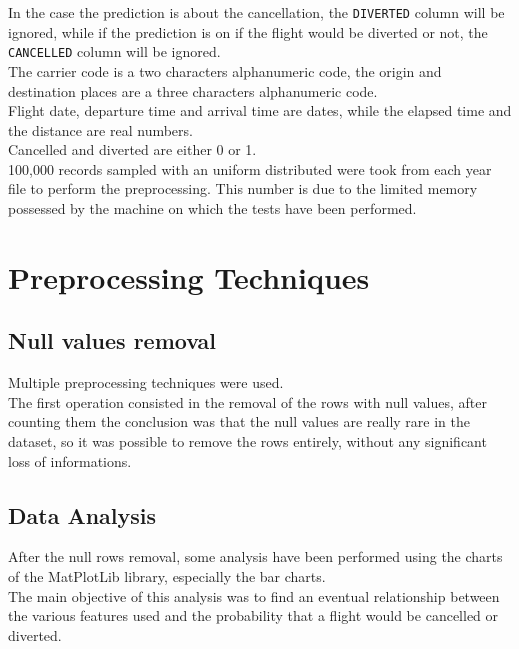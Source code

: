 \documentclass[
	letterpaper, %
	10pt, %
]{class}
\begin{document}
In the case the prediction is about the cancellation, the \texttt{DIVERTED} column will be ignored, while if the prediction is on if the flight would be diverted or not, the \texttt{CANCELLED} column will be ignored.\\

The carrier code is a two characters alphanumeric code, the origin and destination places are a three characters alphanumeric code.\\
Flight date, departure time and arrival time are dates, while the elapsed time and the distance are real numbers.\\
Cancelled and diverted are either 0 or 1.\\

100,000 records sampled with an uniform distributed were took from each year file to perform the preprocessing. This number is due to the limited memory
possessed by the machine on which the tests have been performed.


\section{Preprocessing Techniques}

\subsection{Null values removal}

Multiple preprocessing techniques were used.\\

The first operation consisted in the removal of the rows with null values, after counting them the conclusion was that the null values are really rare in the dataset, so it was possible to remove the rows entirely, without any significant loss of informations.\\

\subsection{Data Analysis}
After the null rows removal, some analysis have been performed using the charts of the MatPlotLib library, especially the bar charts.\\
The main objective of this analysis was to find an eventual relationship between the various features used and the probability that a flight would be cancelled or diverted.\\
\end{document}
